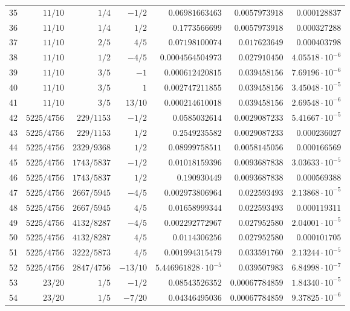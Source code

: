 \documentclass[11pt,reqno]{amsart}
\numberwithin{equation}{section}
\theoremstyle{definition}
\theoremstyle{remark}
\begin{document}
\begin{center}
\begin{longtable}{@{}rrrrrrr@{}}
35 & $11/10$ & $1/4$ & $-1/2$ & $0.06981663463$ & $0.0057973918$ & $0.000128837$\\
36 & $11/10$ & $1/4$ & $1/2$ & $0.1773566699$ & $0.0057973918$ & $0.000327288$\\
37 & $11/10$ & $2/5$ & $4/5$ & $0.07198100074$ & $0.017623649$ & $0.000403798$\\
38 & $11/10$ & $1/2$ & $-4/5$ & $0.0004564504973$ & $0.027910450$ & $4.05518\cdot10^{-6}$\\
39 & $11/10$ & $3/5$ & $-1$ & $0.000612420815$ & $0.039458156$ & $7.69196\cdot10^{-6}$\\
40 & $11/10$ & $3/5$ & $1$ & $0.002747211855$ & $0.039458156$ & $3.45048\cdot10^{-5}$\\
41 & $11/10$ & $3/5$ & $13/10$ & $0.000214610018$ & $0.039458156$ & $2.69548\cdot10^{-6}$\\
42 & $5225/4756$ & $229/1153$ & $-1/2$ & $0.0585032614$ & $0.0029087233$ & $5.41667\cdot10^{-5}$\\
43 & $5225/4756$ & $229/1153$ & $1/2$ & $0.2549235582$ & $0.0029087233$ & $0.000236027$\\
44 & $5225/4756$ & $2329/9368$ & $1/2$ & $0.08999758511$ & $0.0058145056$ & $0.000166569$\\
45 & $5225/4756$ & $1743/5837$ & $-1/2$ & $0.01018159396$ & $0.0093687838$ & $3.03633\cdot10^{-5}$\\
46 & $5225/4756$ & $1743/5837$ & $1/2$ & $0.190930449$ & $0.0093687838$ & $0.000569388$\\
47 & $5225/4756$ & $2667/5945$ & $-4/5$ & $0.002973806964$ & $0.022593493$ & $2.13868\cdot10^{-5}$\\
48 & $5225/4756$ & $2667/5945$ & $4/5$ & $0.01658999344$ & $0.022593493$ & $0.000119311$\\
49 & $5225/4756$ & $4132/8287$ & $-4/5$ & $0.002292772967$ & $0.027952580$ & $2.04001\cdot10^{-5}$\\
50 & $5225/4756$ & $4132/8287$ & $4/5$ & $0.0114306256$ & $0.027952580$ & $0.000101705$\\
51 & $5225/4756$ & $3222/5873$ & $4/5$ & $0.001994315479$ & $0.033591760$ & $2.13244\cdot10^{-5}$\\
52 & $5225/4756$ & $2847/4756$ & $-13/10$ & $5.446961828\cdot10^{-5}$ & $0.039507983$ & $6.84998\cdot10^{-7}$\\
53 & $23/20$ & $1/5$ & $-1/2$ & $0.08543526352$ & $0.00067784859$ & $1.84340\cdot10^{-5}$\\
54 & $23/20$ & $1/5$ & $-7/20$ & $0.04346495036$ & $0.00067784859$ & $9.37825\cdot10^{-6}$\\

\end{longtable}
\end{center}
\end{document}
